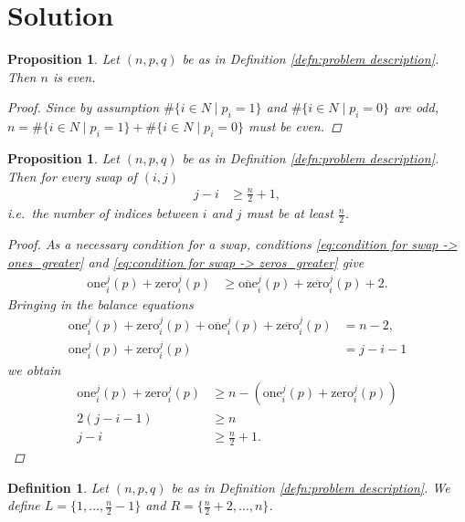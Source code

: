 \documentclass[12pt]{article}
\newtheorem{defn}[thm]{Definition}
\newtheorem{prop}[thm]{Proposition}
\begin{document}
\section{Solution}
\begin{prop}
Let $(n, p, q)$ be as in Definition \ref{defn:problem description}. Then $n$ is even.
\begin{proof}
Since by assumption $\#\{ i \in N\mid p_i=1 \}$ and $\#\{ i \in N\mid p_i=0 \}$ are odd, $n=\#\{ i \in N\mid p_i=1 \} + \#\{ i \in N\mid p_i=0 \}$ must be even.
\end{proof}
\end{prop}


\begin{prop}
Let $(n, p, q)$ be as in Definition \ref{defn:problem description}. Then for every swap of $(i, j)$
\begin{align}
j-i
&\geq \frac{n}{2}+1,
\label{eq:j-i>n/2}
\end{align} 
i.e.\ the number of indices between $i$ and $j$ must be at least $\frac{n}{2}$.
\begin{proof}
As a necessary condition for a swap, conditions \eqref{eq:condition for swap -> ones_greater} and \eqref{eq:condition for swap -> zeros_greater} give
\begin{align*}
\mathrm{one}_i^{j}(p) + \mathrm{zero}_i^{j}(p)
&\geq
\overline{\mathrm{one}}_i^{j}(p) + \overline{\mathrm{zero}}_i^{j}(p) + 2.
\end{align*}
Bringing in the balance equations
\begin{align*}
\mathrm{one}_i^{j}(p) + \mathrm{zero}_i^{j}(p)
+
\overline{\mathrm{one}}_i^{j}(p) + \overline{\mathrm{zero}}_i^{j}(p) 
&=
n-2,
\\
\mathrm{one}_i^{j}(p) + \mathrm{zero}_i^{j}(p)
&=
j-i-1
\end{align*}
we obtain
\begin{align*}
\mathrm{one}_i^{j}(p) + \mathrm{zero}_i^{j}(p)
&\geq
n- (\mathrm{one}_i^{j}(p) + \mathrm{zero}_i^{j}(p))
\\
2(j-i-1)
&\geq
n
\\
j-i
&\geq \frac{n}{2}+1.
\end{align*}
\end{proof}
\end{prop}

\begin{defn}
Let $(n, p, q)$ be as in Definition \ref{defn:problem description}.
We define $L=\{1,\dots, \frac{n}{2}-1\}$ and $R=\{\frac{n}{2}+2,\dots, n\}$.
\end{defn}
\end{document}
